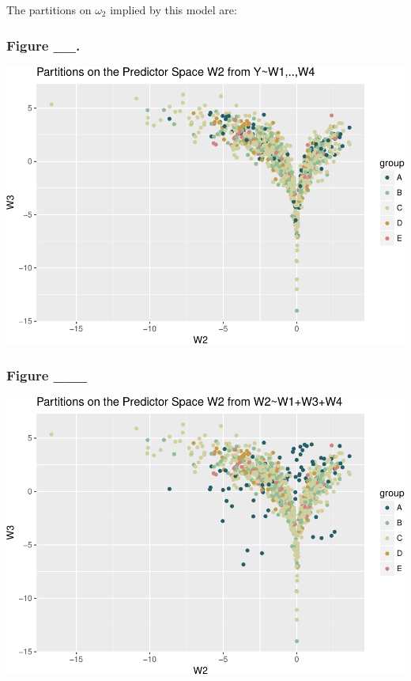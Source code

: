\documentclass[12pt,twoside]{reedthesis}
\begin{document}
  The partitions on \(\omega_2\) implied by this model are:
  
  \subsubsection{Figure \_\_.}\label{figure-__.-1}
  
  \begin{center}\includegraphics{Thesis_files/figure-latex/unnamed-chunk-8-1} \end{center}
  
  \subsubsection{Figure \_\_\_}\label{figure-___}
  
  \begin{center}\includegraphics{Thesis_files/figure-latex/unnamed-chunk-9-1} \end{center}
  
\end{document}
